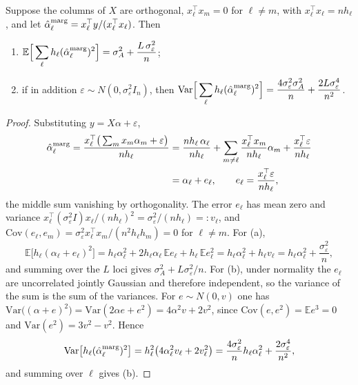 \begin{proposition}
\label{hs:prop:bias}
Suppose the columns of $X$ are orthogonal, $x_\ell^\top x_m = 0$ for $\ell \ne m$, with $x_\ell^\top x_\ell = n h_\ell$, and let $\hat\alpha^{\rm marg}_\ell = x_\ell^\top y/(x_\ell^\top x_\ell)$. Then
\begin{enumerate}[label=(\alph*)]
\item $\displaystyle\mathbb{E}\Big[\sum_\ell h_\ell (\hat\alpha^{\rm marg}_\ell)^2\Big]
= \sigma^2_A + \frac{L\,\sigma^2_\varepsilon}{n}$;
\item if in addition $\varepsilon \sim N(0,\sigma^2_\varepsilon I_n)$, then
$\displaystyle\mathrm{Var}\Big[\sum_\ell h_\ell (\hat\alpha^{\rm marg}_\ell)^2\Big]
= \frac{4\sigma^2_\varepsilon\sigma^2_A}{n} + \frac{2L\sigma^4_\varepsilon}{n^2}$.
\end{enumerate}
\end{proposition}

\begin{proof}
Substituting $y = X\alpha + \varepsilon$,
\begin{align*}
\hat\alpha^{\rm marg}_\ell = \frac{x_\ell^\top\big(\sum_m x_m\alpha_m + \varepsilon\big)}{n h_\ell}
&= \frac{n h_\ell\,\alpha_\ell}{n h_\ell} + \sum_{m\ne\ell}\frac{x_\ell^\top x_m}{nh_\ell}\alpha_m + \frac{x_\ell^\top\varepsilon}{nh_\ell}\\
&= \alpha_\ell + e_\ell,
\qquad e_\ell = \frac{x_\ell^\top\varepsilon}{nh_\ell},
\end{align*}
the middle sum vanishing by orthogonality. The error $e_\ell$ has mean zero and variance $x_\ell^\top(\sigma^2_\varepsilon I)x_\ell/(nh_\ell)^2 = \sigma^2_\varepsilon/(nh_\ell) =: v_\ell$, and $\mathrm{Cov}(e_\ell,e_m) = \sigma^2_\varepsilon x_\ell^\top x_m/(n^2h_\ell h_m) = 0$ for $\ell\ne m$. For (a),
\[
\mathbb{E}\big[h_\ell(\alpha_\ell + e_\ell)^2\big] = h_\ell\alpha_\ell^2 + 2h_\ell\alpha_\ell\,\mathbb{E}e_\ell + h_\ell\,\mathbb{E}e_\ell^2 = h_\ell\alpha_\ell^2 + h_\ell v_\ell = h_\ell\alpha_\ell^2 + \frac{\sigma^2_\varepsilon}{n},
\]
and summing over the $L$ loci gives $\sigma^2_A + L\sigma^2_\varepsilon/n$. For (b), under normality the $e_\ell$ are uncorrelated jointly Gaussian and therefore independent, so the variance of the sum is the sum of the variances. For $e \sim N(0,v)$ one has $\mathrm{Var}\big((\alpha+e)^2\big) = \mathrm{Var}(2\alpha e + e^2) = 4\alpha^2 v + 2v^2$, since $\mathrm{Cov}(e,e^2) = \mathbb{E}e^3 = 0$ and $\mathrm{Var}(e^2) = 3v^2 - v^2$. Hence
\[
\mathrm{Var}\big[h_\ell(\hat\alpha^{\rm marg}_\ell)^2\big] = h_\ell^2\big(4\alpha_\ell^2 v_\ell + 2v_\ell^2\big) = \frac{4\sigma^2_\varepsilon}{n}h_\ell\alpha_\ell^2 + \frac{2\sigma^4_\varepsilon}{n^2},
\]
and summing over $\ell$ gives (b).
\end{proof}

